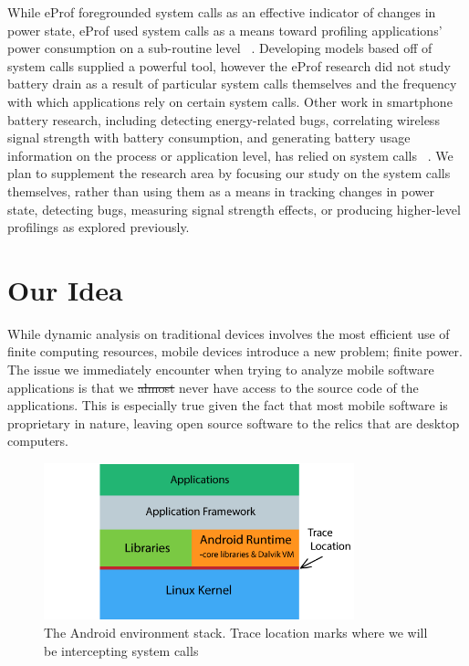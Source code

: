 \documentclass[11pt]{article}
\begin{document}
While eProf foregrounded system calls as an effective indicator of changes in power
state, eProf used system calls as a means toward profiling applications' power 
consumption on a sub-routine level ~\cite{pathak-systemcall,pathak-eprof}.  Developing models based off of system 
calls supplied a powerful tool, however the eProf research did not study battery drain 
as a result of  particular system calls themselves and the frequency with which 
applications rely on certain system calls.  Other work in smartphone battery 
research, including detecting energy-related bugs, correlating wireless signal strength 
with battery consumption, and generating battery usage information on the process or 
application level, has relied on system calls ~\cite{yoon-appscope,pathak-bugs,ding-signals}.  We plan to supplement the 
research area by focusing our study on the system calls themselves, rather than using 
them as a means in tracking changes in power state, detecting bugs, measuring signal 
strength effects, or producing higher-level profilings as explored previously.

\section{Our Idea}

While dynamic analysis on traditional devices involves the most efficient use of finite 
computing resources, mobile devices introduce a new problem; finite power. The issue we 
immediately encounter when trying to analyze mobile software applications is that we 
\sout{almost} never have access to the source code of the applications. This is 
especially true given the fact that most mobile software is proprietary in nature, 
leaving open source software to the relics that are desktop computers.

\begin{figure}[h]
  \centerline{
        \includegraphics[width=90mm]{images/environment_graphic.png}
  }
  \caption{The Android environment stack. Trace location marks where we will be intercepting system calls}
  
 \end{figure}
\end{document}
